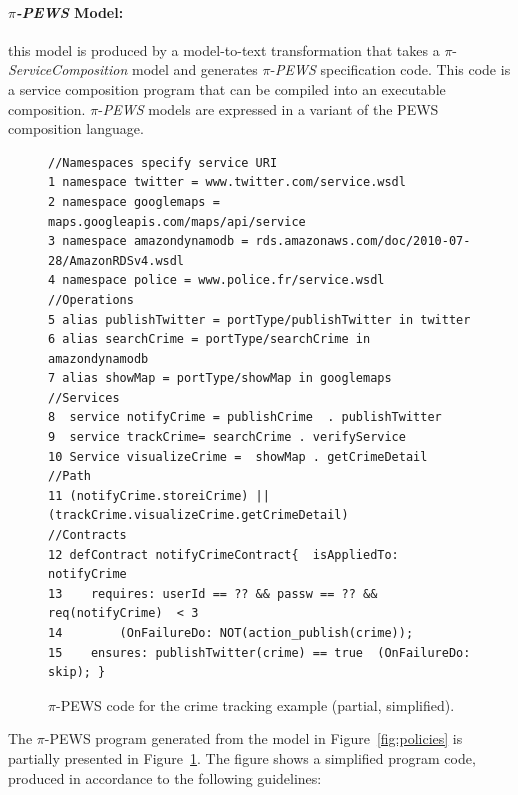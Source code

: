 \paragraph*{$\pi$\textit{-PEWS} Model:}
this model is produced by a model-to-text transformation that takes a $\pi$-\textit{ServiceComposition} model and generates $\pi$-\textit{PEWS} specification code.
This code is a service composition program that can be compiled into an executable composition.
$\pi$-\textit{PEWS} models are expressed in a variant of the PEWS composition language.
\begin{figure}[t]
\begin{small}
\begin{verbatim}
//Namespaces specify service URI
1 namespace twitter = www.twitter.com/service.wsdl
2 namespace googlemaps = maps.googleapis.com/maps/api/service
3 namespace amazondynamodb = rds.amazonaws.com/doc/2010-07-28/AmazonRDSv4.wsdl
4 namespace police = www.police.fr/service.wsdl
//Operations 
5 alias publishTwitter = portType/publishTwitter in twitter
6 alias searchCrime = portType/searchCrime in amazondynamodb 
7 alias showMap = portType/showMap in googlemaps 
//Services
8  service notifyCrime = publishCrime  . publishTwitter 
9  service trackCrime= searchCrime . verifyService
10 Service visualizeCrime =  showMap . getCrimeDetail
//Path
11 (notifyCrime.storeiCrime) || (trackCrime.visualizeCrime.getCrimeDetail)
//Contracts
12 defContract notifyCrimeContract{  isAppliedTo: notifyCrime
13	  requires: userId == ?? && passw == ?? && req(notifyCrime)  < 3
14 	      (OnFailureDo: NOT(action_publish(crime));
15	  ensures: publishTwitter(crime) == true  (OnFailureDo: skip); }
\end{verbatim}
\end{small}
\caption{$\pi$-PEWS code for the crime tracking example (partial, simplified).\label{fig:pewscontract} }
\end{figure}
The $\pi$-PEWS program generated from the model in Figure~\ref{fig:policies} is partially presented in Figure~\ref{fig:pewscontract}. 
The figure shows a simplified program code, produced in accordance to the following guidelines:
